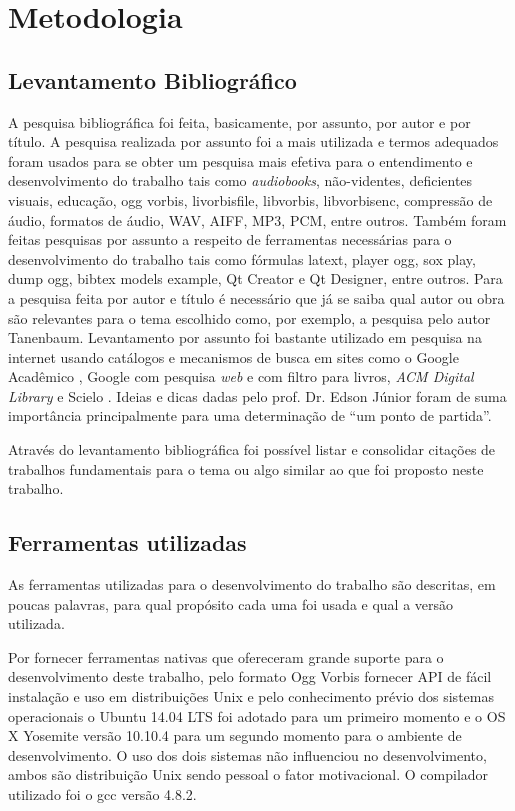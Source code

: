 \chapter[Metodologia]{Metodologia}\label{cap3}

\section{Levantamento Bibliográfico}

A pesquisa bibliográfica foi feita, basicamente, por assunto, por autor e por título. A pesquisa realizada por assunto foi a mais utilizada e termos adequados foram usados para se obter um pesquisa mais efetiva para o entendimento e desenvolvimento do trabalho tais como \textit{audiobooks}, não-videntes, deficientes visuais, educação, ogg vorbis, livorbisfile, libvorbis, libvorbisenc, compressão de áudio, formatos de áudio, WAV, AIFF, MP3, PCM, entre outros. Também foram feitas pesquisas por assunto a respeito de ferramentas necessárias para o desenvolvimento do trabalho tais como fórmulas latext, player ogg, sox play, dump ogg, bibtex models example, Qt Creator e Qt Designer, entre outros. Para a pesquisa feita por autor e título é necessário que já se saiba qual autor ou obra são relevantes para o tema escolhido como, por exemplo, a pesquisa pelo autor Tanenbaum. Levantamento por assunto foi bastante utilizado em pesquisa na internet usando catálogos e mecanismos de busca em sites como o Google Acadêmico \cite{googleacademico}, Google com pesquisa \textit{web} e com filtro para livros, \textit{ACM Digital Library} \cite{acm} e Scielo \cite{scielo}. Ideias e dicas dadas pelo prof. Dr. Edson Júnior foram de suma importância principalmente para uma determinação de ``um ponto de partida''.

Através do levantamento bibliográfica foi possível listar e consolidar citações de trabalhos fundamentais para o tema ou algo similar ao que foi proposto neste trabalho.

\section{Ferramentas utilizadas}

As ferramentas utilizadas para o desenvolvimento do trabalho são descritas, em poucas palavras, para qual propósito cada uma foi usada e qual a versão utilizada.

Por fornecer ferramentas nativas que ofereceram grande suporte para o desenvolvimento deste trabalho, pelo formato Ogg Vorbis fornecer API de fácil instalação e uso em distribuições Unix e pelo conhecimento prévio dos sistemas operacionais o Ubuntu 14.04 LTS foi adotado para um primeiro momento e o OS X Yosemite versão 10.10.4 para um segundo momento para o ambiente de desenvolvimento. O uso dos dois sistemas não influenciou no desenvolvimento, ambos são distribuição Unix sendo pessoal o fator motivacional. O compilador utilizado foi o gcc versão 4.8.2.

